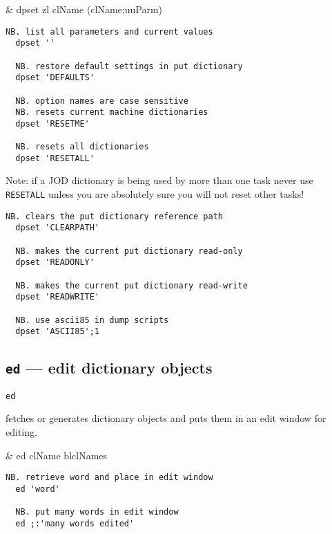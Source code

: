\begin{wordhead}
\monad & dpset zl \argsep clName \argsep (clName;uuParm) \\
\end{wordhead}
\begin{lstlisting}[frame=single,framerule=0pt]
  NB. list all parameters and current values
  dpset ''  
  
  NB. restore default settings in put dictionary          
  dpset 'DEFAULTS'    

  NB. option names are case sensitive 
  NB. resets current machine dictionaries
  dpset 'RESETME'  
  
  NB. resets all dictionaries    
  dpset 'RESETALL'
\end{lstlisting}  

Note: if a JOD dictionary is being used 
by more than one task never use \texttt{RESETALL} unless 
you are absolutely sure you will not reset other tasks! 

\begin{lstlisting}[frame=single,framerule=0pt]
  NB. clears the put dictionary reference path
  dpset 'CLEARPATH'  
  
  NB. makes the current put dictionary read-only 
  dpset 'READONLY'    
  
  NB. makes the current put dictionary read-write
  dpset 'READWRITE'   
  
  NB. use ascii85 in dump scripts 
  dpset 'ASCII85';1    
\end{lstlisting}


\subsection{\texttt{ed} --- edit dictionary objects}\label{ss:ed}

\hypertarget{il:ed}{\texttt{ed}} fetches or generates dictionary objects and puts 
them in an edit window for editing.

\begin{wordhead}
\monad & ed clName \argsep blclNames \\
\end{wordhead}
\begin{lstlisting}[frame=single,framerule=0pt]
  NB. retrieve word and place in edit window
  ed 'word'
  
  NB. put many words in edit window 
  ed ;:'many words edited' 
\end{lstlisting} 


